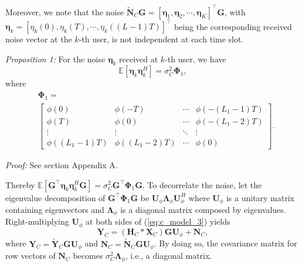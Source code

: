 \documentclass[lettersize,journal]{IEEEtran}
\newcommand{\nocolor}[1]{{\color{black}#1}}
\begin{document}
Moreover, we note that the noise $\widetilde{\mathbf{N}}_C\mathbf{G} = [\bm{\eta}_1, \bm{\eta}_2, \cdots, \bm{\eta}_K]^{\top}\mathbf{G}$, with $\bm{\eta}_k = [\eta_k(0), \eta_k(T), \cdots, \eta_k((L-1)T)]^\top$ being the corresponding received noise vector at the $k$-th user, is not independent at each time slot. 

\textit{Proposition 1:} For the noise $\bm{\eta}_k$ received at $k$-th user, we have
\begin{equation}
    \mathbb{E}[\bm{\eta}_k\bm{\eta}_k^H] = \sigma_C^2\mathbf{\Phi}_1,
\end{equation}
where 
\begin{equation}
\begin{aligned}
    &\mathbf{\Phi}_1 = \\
    &\begin{bmatrix}
        \phi(0) & \phi(-T) & \cdots & \phi(-(L_1-1)T) \\
        \phi(T) & \phi(0) & \cdots & \phi(-(L_1-2)T) \\
        \vdots & \vdots & \ddots & \vdots \\
        \phi((L_1-1)T) & \phi((L_1-2)T) & \cdots & \phi(0)
    \end{bmatrix}.
\end{aligned}
\end{equation}

\textit{Proof:} \nocolor{See section Appendix A}.

Thereby $\mathbb{E}[\mathbf{G}^{\top}\bm{\eta}_k\bm{\eta}_k^H\mathbf{G}] = \sigma_C^2\mathbf{G}^{\top}\mathbf{\Phi}_1\mathbf{G}$.
To decorrelate the noise, \nocolor{let the eigenvalue decomposition of $\mathbf{G}^{\top}\mathbf{\Phi}_1\mathbf{G}$ be} $\mathbf{U}_{\phi}\mathbf{\Lambda}_{\phi}\mathbf{U}_{\phi}^{H}$ where $\mathbf{U}_{\phi}$ is a unitary matrix containing eigenvectors and $\mathbf{\Lambda}_{\phi}$ is a diagonal matrix composed by eigenvalues. Right-multiplying $\mathbf{U}_{\phi}$ at both sides of (\ref{eq:c_model_3}) yields
\begin{equation}
\label{eq:c_model_4}
    \mathbf{Y}_C = (\mathbf{H}_C*\mathbf{X}_C)\mathbf{G}\mathbf{U}_{\phi} + \mathbf{N}_C,
\end{equation}
where $\mathbf{Y}_C=\widetilde{\mathbf{Y}}_C\mathbf{G}\mathbf{U}_{\phi}$ and $\mathbf{N}_C=\widetilde{\mathbf{N}}_C\mathbf{G}\mathbf{U}_{\phi}$.
By doing so, the covariance matrix for row vectors of $\mathbf{N}_C$ becomes $\sigma_C^2\mathbf{\Lambda}_{\phi}$, i.e., a diagonal matrix.
\end{document}
